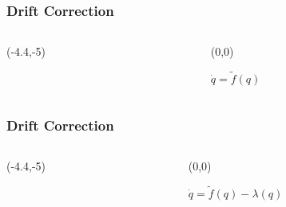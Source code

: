 \begin{frame}
	\frametitle{Drift Correction}
		\begin{columns}[T] %
			\begin{column}{.6\textwidth}
			\centering
				\begin{textblock}{0}(-4.4,-5)
					
				\end{textblock}
			\end{column}
			\hfill
			\begin{column}{0.4\textwidth}
				\begin{textblock}{.9\columnwidth}(0,0)
					\begin{block}{}
					\centering
						\( \dot{q} = \tilde{f}(q) \)
					\end{block}
				\end{textblock}
				\end{column}
		\end{columns}
\end{frame}

\begin{frame}
	\frametitle{Drift Correction}
		\begin{columns}[T] %
			\begin{column}{.6\textwidth}
				\begin{textblock}{0}(-4.4,-5)
					
				\end{textblock}
			\end{column}
			\hfill
			\begin{column}{0.4\textwidth}
				\begin{textblock}{.9\columnwidth}(0,0)
					\begin{block}{}
					\centering
					\( \dot{q} = \tilde{f}(q)-\lambda(q) \)
					\end{block}
				\end{textblock}
				\end{column}
		\end{columns}
\end{frame}
